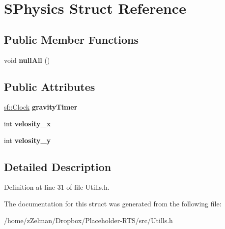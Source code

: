 \hypertarget{structSPhysics}{\section{S\-Physics Struct Reference}
\label{structSPhysics}
}
\subsection*{Public Member Functions}
\begin{DoxyCompactItemize}
\item 
\hypertarget{structSPhysics_ad479f491654cccd32e232189d1436afe}{void {\bfseries null\-All} ()}\label{structSPhysics_ad479f491654cccd32e232189d1436afe}

\end{DoxyCompactItemize}
\subsection*{Public Attributes}
\begin{DoxyCompactItemize}
\item 
\hypertarget{structSPhysics_a863b79d57d74c62fdc6722ecdf16ad2c}{\hyperlink{classsf_1_1Clock}{sf\-::\-Clock} {\bfseries gravity\-Timer}}\label{structSPhysics_a863b79d57d74c62fdc6722ecdf16ad2c}

\item 
\hypertarget{structSPhysics_a3ba5a87492c1aaa5736f0fb24b51d144}{int {\bfseries velosity\-\_\-x}}\label{structSPhysics_a3ba5a87492c1aaa5736f0fb24b51d144}

\item 
\hypertarget{structSPhysics_a44c54c41db476c2f94d6afcabd80ce09}{int {\bfseries velosity\-\_\-y}}\label{structSPhysics_a44c54c41db476c2f94d6afcabd80ce09}

\end{DoxyCompactItemize}


\subsection{Detailed Description}


Definition at line 31 of file Utills.\-h.



The documentation for this struct was generated from the following file\-:\begin{DoxyCompactItemize}
\item 
/home/z\-Zelman/\-Dropbox/\-Placeholder-\/\-R\-T\-S/src/Utills.\-h\end{DoxyCompactItemize}
